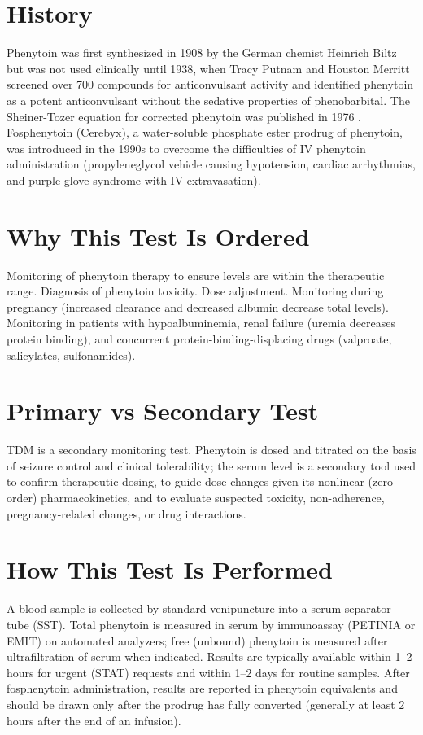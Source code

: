 \section*{History}
Phenytoin was first synthesized in 1908 by the German chemist Heinrich Biltz but was not used clinically until 1938, when Tracy Putnam and Houston Merritt screened over 700 compounds for anticonvulsant activity and identified phenytoin as a potent anticonvulsant without the sedative properties of phenobarbital. The Sheiner-Tozer equation for corrected phenytoin was published in 1976 \cite{sheiner1980clinical}. Fosphenytoin (Cerebyx), a water-soluble phosphate ester prodrug of phenytoin, was introduced in the 1990s to overcome the difficulties of IV phenytoin administration (propyleneglycol vehicle causing hypotension, cardiac arrhythmias, and purple glove syndrome with IV extravasation).

\section*{Why This Test Is Ordered}
Monitoring of phenytoin therapy to ensure levels are within the therapeutic range. Diagnosis of phenytoin toxicity. Dose adjustment. Monitoring during pregnancy (increased clearance and decreased albumin decrease total levels). Monitoring in patients with hypoalbuminemia, renal failure (uremia decreases protein binding), and concurrent protein-binding-displacing drugs (valproate, salicylates, sulfonamides).

\section*{Primary vs Secondary Test}
TDM is a secondary monitoring test. Phenytoin is dosed and titrated on the basis of seizure control and clinical tolerability; the serum level is a secondary tool used to confirm therapeutic dosing, to guide dose changes given its nonlinear (zero-order) pharmacokinetics, and to evaluate suspected toxicity, non-adherence, pregnancy-related changes, or drug interactions.

\section*{How This Test Is Performed}
A blood sample is collected by standard venipuncture into a serum separator tube (SST). Total phenytoin is measured in serum by immunoassay (PETINIA or EMIT) on automated analyzers; free (unbound) phenytoin is measured after ultrafiltration of serum when indicated. Results are typically available within 1--2 hours for urgent (STAT) requests and within 1--2 days for routine samples. After fosphenytoin administration, results are reported in phenytoin equivalents and should be drawn only after the prodrug has fully converted (generally at least 2 hours after the end of an infusion).

